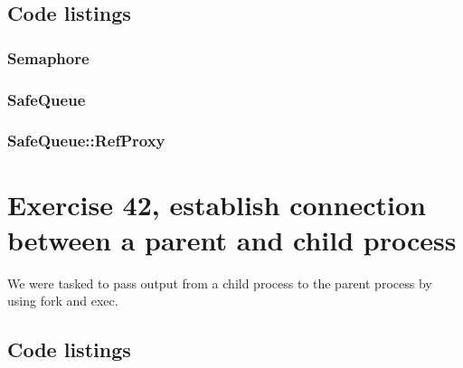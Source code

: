 \documentclass[11pt]{article}
\begin{document}
\subsection*{Code listings}



\subsubsection*{Semaphore}






\subsubsection*{SafeQueue}






\subsubsection*{SafeQueue::RefProxy}





\section*{Exercise 42, establish connection between a parent and child process}
We were tasked to pass output from a child process to the parent process by using fork and exec.

\subsection*{Code listings}



\end{document}
